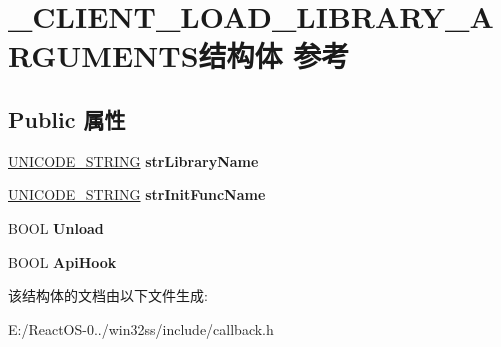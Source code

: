 \hypertarget{struct___c_l_i_e_n_t___l_o_a_d___l_i_b_r_a_r_y___a_r_g_u_m_e_n_t_s}{}\section{\+\_\+\+C\+L\+I\+E\+N\+T\+\_\+\+L\+O\+A\+D\+\_\+\+L\+I\+B\+R\+A\+R\+Y\+\_\+\+A\+R\+G\+U\+M\+E\+N\+T\+S结构体 参考}
\label{struct___c_l_i_e_n_t___l_o_a_d___l_i_b_r_a_r_y___a_r_g_u_m_e_n_t_s}
\subsection*{Public 属性}
\begin{DoxyCompactItemize}
\item 
\mbox{\label{struct___c_l_i_e_n_t___l_o_a_d___l_i_b_r_a_r_y___a_r_g_u_m_e_n_t_s_a0929a925f22ea21dae137010e528df97}} 
\hyperlink{struct___u_n_i_c_o_d_e___s_t_r_i_n_g}{U\+N\+I\+C\+O\+D\+E\+\_\+\+S\+T\+R\+I\+NG} {\bfseries str\+Library\+Name}
\item 
\mbox{\label{struct___c_l_i_e_n_t___l_o_a_d___l_i_b_r_a_r_y___a_r_g_u_m_e_n_t_s_a503cfb644f2900435d1349d139a582a2}} 
\hyperlink{struct___u_n_i_c_o_d_e___s_t_r_i_n_g}{U\+N\+I\+C\+O\+D\+E\+\_\+\+S\+T\+R\+I\+NG} {\bfseries str\+Init\+Func\+Name}
\item 
\mbox{\label{struct___c_l_i_e_n_t___l_o_a_d___l_i_b_r_a_r_y___a_r_g_u_m_e_n_t_s_a2fba9ae8c4ce529e1793ccb2dcd5d6e4}} 
B\+O\+OL {\bfseries Unload}
\item 
\mbox{\label{struct___c_l_i_e_n_t___l_o_a_d___l_i_b_r_a_r_y___a_r_g_u_m_e_n_t_s_a34e2297888380df627087b1c02860265}} 
B\+O\+OL {\bfseries Api\+Hook}
\end{DoxyCompactItemize}


该结构体的文档由以下文件生成\+:\begin{DoxyCompactItemize}
\item 
E\+:/\+React\+O\+S-\/0../win32ss/include/callback.\+h\end{DoxyCompactItemize}
